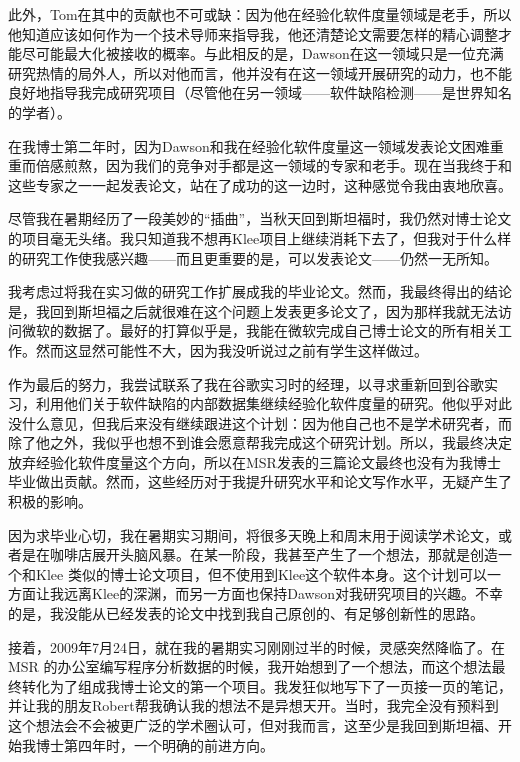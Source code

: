 \documentclass[letter,12pt]{book}
\begin{document}
\begin{CJK}{UTF8}{gbsn}
此外，Tom在其中的贡献也不可或缺：因为他在经验化软件度量领域是老手，所以他知道应该如何作为一个技术导师来指导我，他还清楚论文需要怎样的精心调整才能尽可能最大化被接收的概率。与此相反的是，Dawson在这一领域只是一位充满研究热情的局外人，所以对他而言，他并没有在这一领域开展研究的动力，也不能良好地指导我完成研究项目（尽管他在另一领域——软件缺陷检测——是世界知名的学者）。

在我博士第二年时，因为Dawson和我在经验化软件度量这一领域发表论文困难重重而倍感煎熬，因为我们的竞争对手都是这一领域的专家和老手。现在当我终于和这些专家之一一起发表论文，站在了成功的这一边时，这种感觉令我由衷地欣喜。

\breakline

尽管我在暑期经历了一段美妙的“插曲”，当秋天回到斯坦福时，我仍然对博士论文的项目毫无头绪。我只知道我不想再Klee项目上继续消耗下去了，但我对于什么样的研究工作使我感兴趣——而且更重要的是，可以发表论文——仍然一无所知。

我考虑过将我在实习做的研究工作扩展成我的毕业论文。然而，我最终得出的结论是，我回到斯坦福之后就很难在这个问题上发表更多论文了，因为那样我就无法访问微软的数据了。最好的打算似乎是，我能在微软完成自己博士论文的所有相关工作。然而这显然可能性不大，因为我没听说过之前有学生这样做过。

作为最后的努力，我尝试联系了我在谷歌实习时的经理，以寻求重新回到谷歌实习，利用他们关于软件缺陷的内部数据集继续经验化软件度量的研究。他似乎对此没什么意见，但我后来没有继续跟进这个计划：因为他自己也不是学术研究者，而除了他之外，我似乎也想不到谁会愿意帮我完成这个研究计划。所以，我最终决定放弃经验化软件度量这个方向，所以在MSR发表的三篇论文最终也没有为我博士毕业做出贡献。然而，这些经历对于我提升研究水平和论文写作水平，无疑产生了积极的影响。

因为求毕业心切，我在暑期实习期间，将很多天晚上和周末用于阅读学术论文，或者是在咖啡店展开头脑风暴。在某一阶段，我甚至产生了一个想法，那就是创造一个和Klee 类似的博士论文项目，但不使用到Klee这个软件本身。这个计划可以一方面让我远离Klee的深渊，而另一方面也保持Dawson对我研究项目的兴趣。不幸的是，我没能从已经发表的论文中找到我自己原创的、有足够创新性的思路。

接着，2009年7月24日，就在我的暑期实习刚刚过半的时候，灵感突然降临了。在MSR 的办公室编写程序分析数据的时候，我开始想到了一个想法，而这个想法最终转化为了组成我博士论文的第一个项目。我发狂似地写下了一页接一页的笔记，并让我的朋友Robert帮我确认我的想法不是异想天开。当时，我完全没有预料到这个想法会不会被更广泛的学术圈认可，但对我而言，这至少是我回到斯坦福、开始我博士第四年时，一个明确的前进方向。



\end{CJK}
\end{document}
